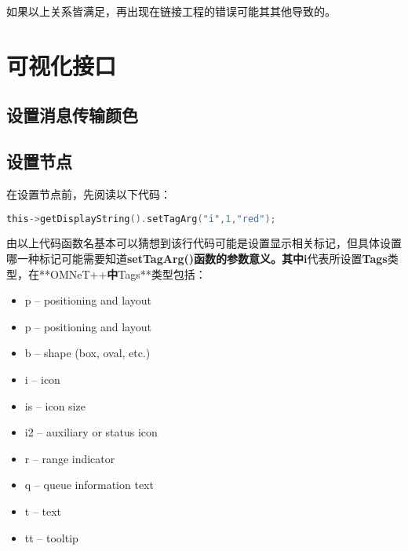 如果以上关系皆满足，再出现在链接工程的错误可能其其他导致的。

\section{可视化接口}
\label{可视化接口}

\subsection{设置消息传输颜色}
\label{设置消息传输颜色}

\subsection{设置节点}
\label{设置节点}

在设置节点前，先阅读以下代码：

\begin{lstlisting}[language=c,caption=an]
this->getDisplayString().setTagArg("i",1,"red");
\end{lstlisting}

由以上代码函数名基本可以猜想到该行代码可能是设置显示相关标记，但具体设置哪一种标记可能需要知道\textbf{setTagArg()\textbf{函数的参数意义。其中}i}代表所设置\textbf{Tags}类型，在**OMNeT++\textbf{中}Tags**类型包括：

\begin{itemize}
\item p -- positioning and layout

\item p -- positioning and layout

\item b -- shape (box, oval, etc.)

\item i -- icon

\item is -- icon size

\item i2 -- auxiliary or status icon

\item r -- range indicator

\item q -- queue information text

\item t -- text

\item tt -- tooltip

\end{itemize}

